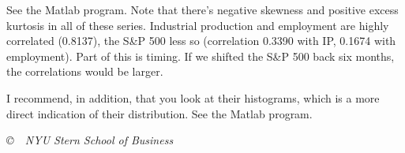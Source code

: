 \documentclass[11pt]{exam}
\begin{document}
\begin{questions}
\begin{solution}
See the Matlab program.
Note that there's negative skewness and positive excess kurtosis
in all of these series.
Industrial production and employment are highly correlated (0.8137), the S\&P 500 less so
(correlation 0.3390 with IP, 0.1674 with employment).
Part of this is timing.  If we shifted the S\&P 500 back six months,
the correlations would be larger.

I recommend, in addition, that you look at their
histograms, which is a more direct indication of their distribution.
See the Matlab program.
\end{solution}

\end{questions}

\vfill \centerline{\it \copyright \ \number\year \ NYU Stern School of Business}
\end{document}
